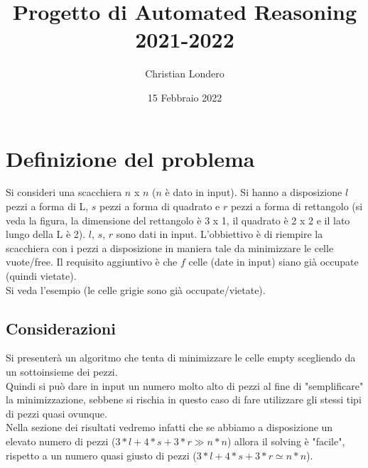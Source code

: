 \documentclass{article}
\title{Progetto di Automated Reasoning\\2021-2022}
\author{ Christian Londero }
\date{15 Febbraio 2022}
\begin{document}
\maketitle

\section{Definizione del problema}
Si consideri una scacchiera $n$ x $n$ ($n$ è dato in input). Si hanno a disposizione $l$ pezzi a forma di L, $s$ pezzi a forma di quadrato e $r$ pezzi a forma di rettangolo (si veda la figura, la dimensione del rettangolo è 3 x 1, il quadrato è 2 x 2 e il lato lungo della L è 2). $l$, $s$, $r$ sono dati in input. L'obbiettivo è di riempire la scacchiera con i pezzi a disposizione in maniera tale da minimizzare le celle vuote/free. Il requisito aggiuntivo è che $f$ celle (date in input) siano già occupate (quindi vietate).\\
Si veda l'esempio (le celle grigie sono già occupate/vietate).

\subsection{Considerazioni}
Si presenterà un algoritmo che tenta di minimizzare le celle empty scegliendo da un sottoinsieme dei pezzi. \\
Quindi si può dare in input un numero molto alto di pezzi al fine di "semplificare" la minimizzazione, sebbene si rischia in questo caso di fare utilizzare gli stessi tipi di pezzi quasi ovunque.\\
Nella sezione dei risultati vedremo infatti che se abbiamo a disposizione un elevato numero di pezzi ($3*l + 4*s + 3*r \gg n*n$) allora il solving è "facile", rispetto a un numero quasi giusto di pezzi ($3*l + 4*s + 3*r \simeq n*n$).
\end{document}
